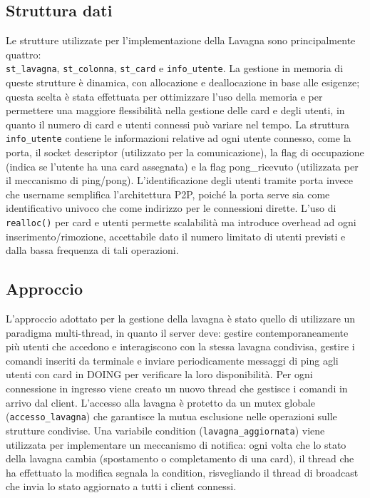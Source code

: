 \documentclass[a4paper,11pt]{article}
\begin{document}
\subsection*{Struttura dati}
Le strutture utilizzate per l'implementazione della Lavagna sono principalmente quattro: \\
\texttt{st\_lavagna}, \texttt{st\_colonna}, \texttt{st\_card} e \texttt{info\_utente}.
La gestione in memoria di queste strutture è dinamica, con allocazione e deallocazione in base alle esigenze; questa scelta 
è stata effettuata per ottimizzare l'uso della memoria e per permettere una maggiore flessibilità nella gestione delle card e degli utenti, 
in quanto il numero di card e utenti connessi può variare nel tempo. 
La struttura \texttt{info\_utente} contiene le informazioni relative ad ogni utente connesso, come la porta, il socket descriptor (utilizzato per la comunicazione), 
la flag di occupazione (indica se l'utente ha una card assegnata) e la flag pong\_ricevuto (utilizzata per il meccanismo di ping/pong). 
L'identificazione degli utenti tramite porta invece che username semplifica l'architettura P2P, poiché la porta serve sia come identificativo univoco 
che come indirizzo per le connessioni dirette. L'uso di \texttt{realloc()} per card e utenti permette scalabilità ma introduce overhead ad ogni 
inserimento/rimozione, accettabile dato il numero limitato di utenti previsti e dalla bassa frequenza di tali operazioni.

\subsection*{Approccio}
L'approccio adottato per la gestione della lavagna è stato quello di utilizzare un paradigma multi-thread, 
in quanto il server deve: gestire contemporaneamente più utenti che accedono e interagiscono con la stessa lavagna condivisa, gestire i comandi inseriti da terminale 
e inviare periodicamente messaggi di ping agli utenti con card in DOING per verificare la loro disponibilità. 
Per ogni connessione in ingresso viene creato un nuovo thread che gestisce i comandi in arrivo dal client. L'accesso alla lavagna è protetto 
da un mutex globale (\texttt{accesso\_lavagna}) che garantisce la mutua esclusione nelle operazioni sulle strutture condivise. Una variabile condition (\texttt{lavagna\_aggiornata}) viene utilizzata per implementare un meccanismo di notifica: 
ogni volta che lo stato della lavagna cambia (spostamento o completamento di una card), il thread che ha effettuato la modifica 
segnala la condition, risvegliando il thread di broadcast che invia lo stato aggiornato a tutti i client connessi.
\end{document}
